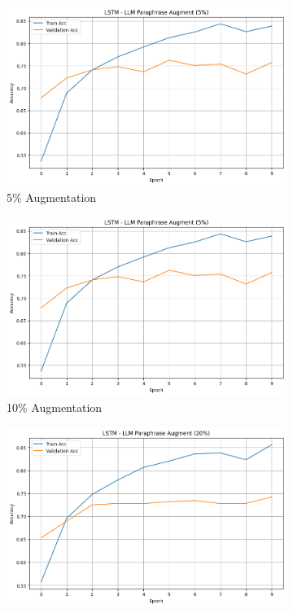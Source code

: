 \documentclass[10pt]{extarticle}
\begin{document}
\begin{figure}[ht]
  \centering
  \begin{subfigure}[b]{0.3\textwidth}
    \includegraphics[width=\textwidth]{img/llm_5_lstm.png}
    \caption{5\% Augmentation}
    \label{fig:llm_5_lstm}
  \end{subfigure}
  \hfill
  \begin{subfigure}[b]{0.3\textwidth}
    \includegraphics[width=\textwidth]{img/llm_10_lstm.png}
    \caption{10\% Augmentation}
    \label{fig:llm_10_lstm}
  \end{subfigure}
  \hfill
  \begin{subfigure}[b]{0.3\textwidth}
    \includegraphics[width=\textwidth]{img/llm_20_lstm.png}

\end{subfigure}
\end{figure}
\end{document}
